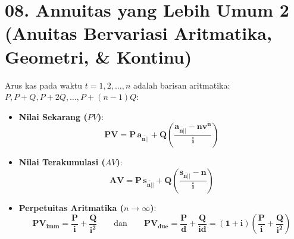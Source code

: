 \documentclass[10pt,a4paper]{article}
\newcommand{\angl}[1]{\overline{#1|}}
\begin{document}
\section*{\large 08. Annuitas yang Lebih Umum 2 (Anuitas Bervariasi Aritmatika, Geometri, \& Kontinu)}

\begin{rumusbox}
Arus kas pada waktu $t = 1, 2, \dots, n$ adalah barisan aritmatika: $P, P+Q, P+2Q, \dots, P+(n-1)Q$:
\begin{itemize}[leftmargin=1.5em, topsep=1.5pt, itemsep=2pt]
    \item \textbf{Nilai Sekarang ($PV$)}:
    \begin{equation*}
        \mathbf{PV = P \, a_{\angl{n}|} + Q \left( \frac{a_{\angl{n}|} - n v^n}{i} \right)}
    \end{equation*}
    \item \textbf{Nilai Terakumulasi ($AV$)}:
    \begin{equation*}
        \mathbf{AV = P \, s_{\angl{n}|} + Q \left( \frac{s_{\angl{n}|} - n}{i} \right)}
    \end{equation*}
    \item \textbf{Perpetuitas Aritmatika ($n \to \infty$)}:
    \begin{equation*}
        \mathbf{PV_{\text{imm}} = \frac{P}{i} + \frac{Q}{i^2}} \qquad\text{dan}\qquad \mathbf{PV_{\text{due}} = \frac{P}{d} + \frac{Q}{id} = (1+i) \left( \frac{P}{i} + \frac{Q}{i^2} \right)}
    \end{equation*}
\end{itemize}
\end{rumusbox}
\end{document}
